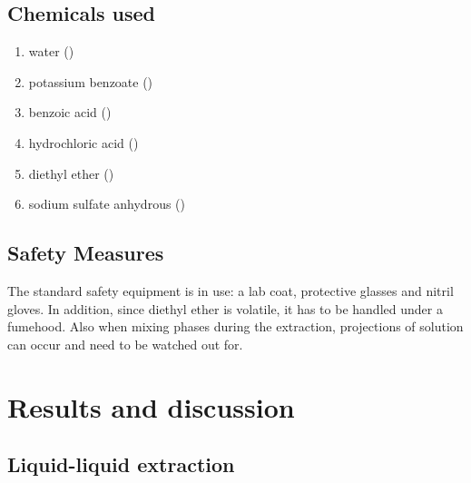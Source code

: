 \documentclass{article}
\begin{document}
\subsection{Chemicals used}

\begin{enumerate}
    \item water ()
    \item potassium benzoate ()
    \item benzoic acid ()
    \item hydrochloric acid ()
    \item diethyl ether ()    
    \item sodium sulfate anhydrous ()
\end{enumerate}

\subsection{Safety Measures}

The standard safety equipment is in use: a lab coat, protective glasses and nitril gloves. In addition, since diethyl ether is volatile, it has to be handled under a fumehood. Also when mixing phases during the extraction, projections of solution can occur and need to be watched out for.

\section{Results and discussion}

\subsection{Liquid-liquid extraction}
\end{document}

